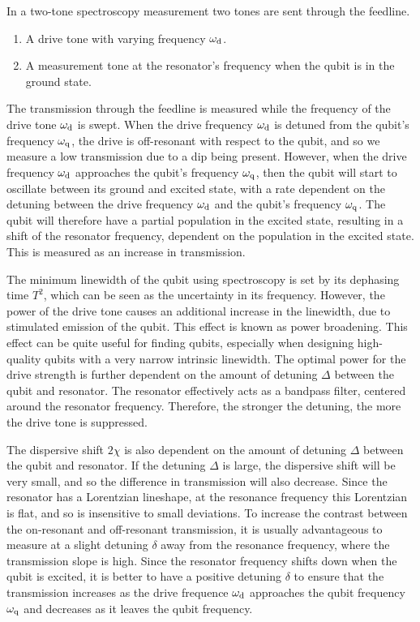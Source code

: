           In a two-tone spectroscopy measurement two tones are sent through the feedline.
          \begin{enumerate}
            \item A drive tone with varying frequency $\omega_\text{d}$.
            \item A measurement tone at the resonator's frequency when the qubit is in the ground state.
          \end{enumerate}

          The transmission through the feedline is measured while the frequency of the drive tone $\omega_\text{d}$ is swept. When the drive frequency $\omega_\text{d}$ is detuned from the qubit's frequency $\omega_\text{q}$, the drive is off-resonant with respect to the qubit, and so we measure a low transmission due to a dip being present. However, when the drive frequency $\omega_\text{d}$ approaches the qubit's frequency $\omega_\text{q}$, then the qubit will start to oscillate between its ground and excited state, with a rate dependent on the detuning between the drive frequency $\omega_\text{d}$ and the qubit's frequency $\omega_\text{q}$. The qubit will therefore have a partial population in the excited state, resulting in a shift of the resonator frequency, dependent on the population in the excited state. This is measured as an increase in transmission.

          The minimum linewidth of the qubit using spectroscopy is set by its dephasing time $T^2$, which can be seen as the uncertainty in its frequency. However, the power of the drive tone causes an additional increase in the linewidth, due to stimulated emission of the qubit. This effect is known as power broadening. This effect can be quite useful for finding qubits, especially when designing high-quality qubits with a very narrow intrinsic linewidth. The optimal power for the drive strength is further dependent on the amount of detuning $\Delta$ between the qubit and resonator. The resonator effectively acts as a bandpass filter, centered around the resonator frequency. Therefore, the stronger the detuning, the more the drive tone is suppressed.

          The dispersive shift $2 \chi$ is also dependent on the amount of detuning $\Delta$ between the qubit and resonator. If the detuning $\Delta$ is large, the dispersive shift will be very small, and so the difference in transmission will also decrease. Since the resonator has a Lorentzian lineshape, at the resonance frequency this Lorentzian is flat, and so is insensitive to small deviations. To increase the contrast between the on-resonant and off-resonant transmission, it is usually advantageous to measure at a slight detuning $\delta$ away from the resonance frequency, where the transmission slope is high. Since the resonator frequency shifts down when the qubit is excited, it is better to have a positive detuning $\delta$ to ensure that the transmission increases as the drive frequence $\omega_\text{d}$ approaches the qubit frequency $\omega_\text{q}$ and decreases as it leaves the qubit frequency.

